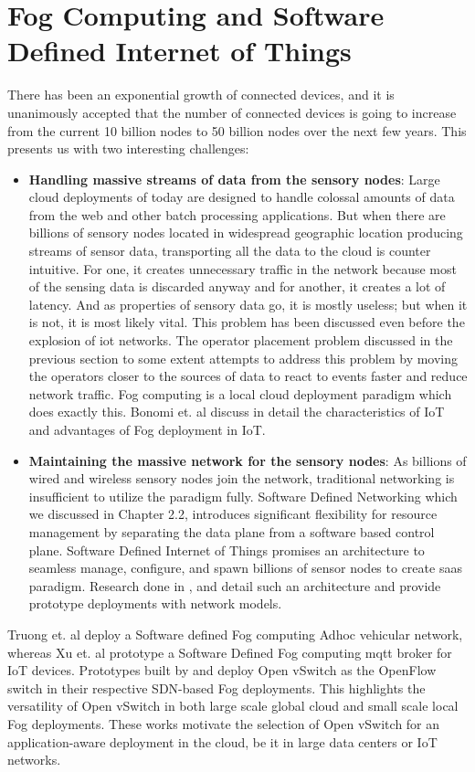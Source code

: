 \section{Fog Computing and Software Defined Internet of Things}
There has been an exponential growth of connected devices, and it is unanimously accepted that the number of connected devices is going to increase from the current 10 billion nodes to 50 billion nodes over the next few years. This presents us with two interesting challenges: 
\begin{itemize}
\item \textbf{Handling massive streams of data from the sensory nodes}: Large cloud deployments of today are designed to handle colossal amounts of data from the web and other batch processing applications. But when there are billions of sensory nodes located in widespread geographic location producing streams of sensor data, transporting all the data to the cloud is counter intuitive. For one, it creates unnecessary traffic in the network because most of the sensing data is discarded anyway and for another, it creates a lot of latency. And as properties of sensory data go, it is mostly useless; but when it is not, it is most likely vital. This problem has been discussed even before the explosion of \ac{iot} networks. The operator placement problem discussed in the previous section to some extent attempts to address this problem by moving the operators closer to the sources of data to react to events faster and reduce network traffic. Fog computing is a local cloud deployment paradigm which does exactly this. Bonomi et. al \cite{bonomi2012fog} discuss in detail the characteristics of IoT and advantages of Fog deployment in IoT. 
\item \textbf{Maintaining the massive network for the sensory nodes}: As billions of wired and wireless sensory nodes join the network, traditional networking is insufficient to utilize the paradigm fully. Software Defined Networking which we discussed in Chapter 2.2, introduces significant flexibility for resource management by separating the data plane from a software based control plane. Software Defined Internet of Things promises an architecture to seamless manage, configure, and spawn billions of sensor nodes to create \ac{saas} paradigm. Research done in \cite{el2015software} , \cite{qin2014software} and \cite{flauzac2015sdn} detail such an architecture and provide prototype deployments with network models.
\end{itemize} 
Truong et. al \cite{truong2015software} deploy a Software defined Fog computing Adhoc vehicular network, whereas Xu et. al \cite{xu2016towards}  prototype a Software Defined Fog computing \ac{mqtt}  broker for IoT devices. Prototypes built by \cite{xu2016towards} and \cite{flauzac2015sdn} deploy Open vSwitch as the OpenFlow switch in their respective SDN-based Fog deployments. This highlights the versatility of Open vSwitch in both large scale global cloud and small scale local Fog deployments. These works motivate the selection of Open vSwitch for an application-aware deployment in the cloud, be it in large data centers or IoT networks.

